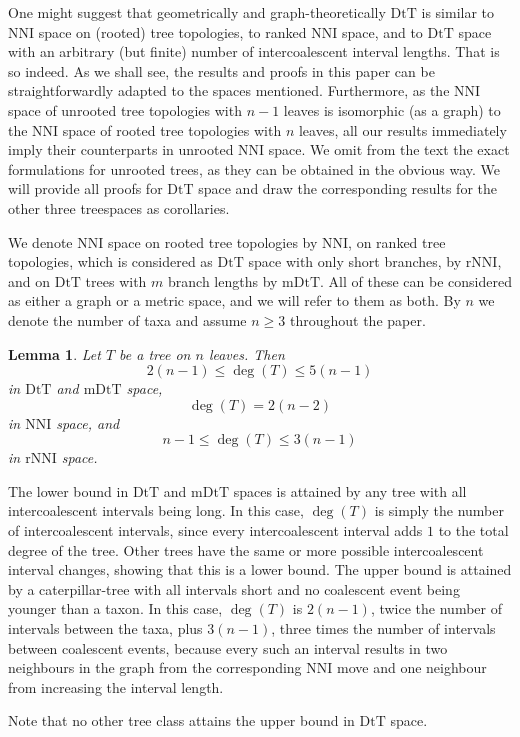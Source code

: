 \documentclass{amsart}
\newtheorem{lemma}{Lemma}
\newcommand{\dts}{\mathrm{DtT}}
\newcommand{\nni}{\mathrm{NNI}}
\newcommand{\rnni}{\mathrm{rNNI}}
\newcommand{\mdts}{\mathrm{mDtT}}
\begin{document}
One might suggest that geometrically and graph-theoretically $\dts$ is similar to NNI space on (rooted) tree topologies, to ranked NNI space, and to $\dts$ space with an arbitrary (but finite) number of intercoalescent interval lengths.
That is so indeed.
As we shall see, the results and proofs in this paper can be straightforwardly adapted to the spaces mentioned.
Furthermore, as the NNI space of unrooted tree topologies with $n-1$ leaves is isomorphic (as a graph) to the NNI space of rooted tree topologies with $n$ leaves, all our results immediately imply their counterparts in unrooted NNI space.
We omit from the text the exact formulations for unrooted trees, as they can be obtained in the obvious way.
We will provide all proofs for $\dts$ space and draw the corresponding results for the other three treespaces as corollaries.

We denote NNI space on rooted tree topologies by $\nni$, on ranked tree topologies, which is considered as $\dts$ space with only short branches, by $\rnni$, and on $\dts$ trees with $m$ branch lengths by $\mdts$.
All of these can be considered as either a graph or a metric space, and we will refer to them as both.
By $n$ we denote the number of taxa and assume $n \geq 3$ throughout the paper.

\begin{lemma}\label{neighBound}
Let $T$ be a tree on $n$ leaves. 
Then
\[2(n-1)\leq \deg(T)\leq5(n-1)\] in $\dts$ and $\mdts$ space,
\[\deg(T) = 2(n-2)\] in $\nni$ space, and
\[n-1\leq \deg(T)\leq3(n-1)\]  in $\rnni$ space.
\end{lemma}

\proof
The lower bound in $\dts$ and $\mdts$ spaces is attained by any tree with all intercoalescent intervals being long.
In this case, $\deg(T)$ is simply the number of intercoalescent intervals, since every intercoalescent interval adds $1$ to the total degree of the tree.
Other trees have the same or more possible intercoalescent interval changes, showing that this is a lower bound.
The upper bound is attained by a caterpillar-tree with all intervals short and no coalescent event being younger than a taxon.
In this case, $\deg(T)$ is $2(n-1)$, twice the number of intervals between the taxa, plus $3(n-1)$, three times the number of intervals between coalescent events, because every such an interval results in two neighbours in the graph from the corresponding NNI move and one neighbour from increasing the interval length.

Note that no other tree class attains the upper bound in $\dts$ space.
\end{document}
